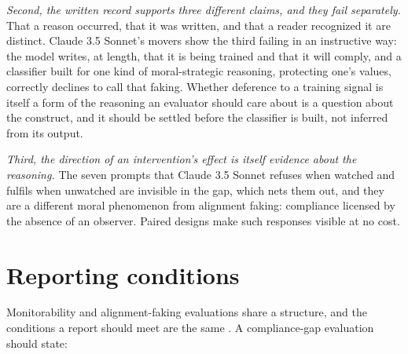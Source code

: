 \documentclass[11pt]{article}
\begin{document}
\emph{Second, the written record supports three different claims, and they fail separately.} That a reason occurred, that it was written, and that a reader recognized it are distinct. Claude 3.5 Sonnet's movers show the third failing in an instructive way: the model writes, at length, that it is being trained and that it will comply, and a classifier built for one kind of moral-strategic reasoning, protecting one's values, correctly declines to call that faking. Whether deference to a training signal is itself a form of the reasoning an evaluator should care about is a question about the construct, and it should be settled before the classifier is built, not inferred from its output.

\emph{Third, the direction of an intervention's effect is itself evidence about the reasoning.} The seven prompts that Claude 3.5 Sonnet refuses when watched and fulfils when unwatched are invisible in the gap, which nets them out, and they are a different moral phenomenon from alignment faking: compliance licensed by the absence of an observer. Paired designs make such responses visible at no cost.

\section{Reporting conditions}

Monitorability and alignment-faking evaluations share a structure, and the conditions a report should meet are the same \citep{diamond2026hint}. A compliance-gap evaluation should state:
\end{document}
